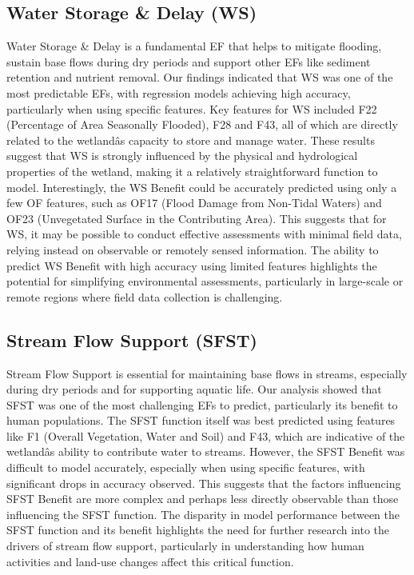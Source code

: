 \documentclass[12pt,letterpaper]{article}
\begin{document}
\subsection{Water Storage \& Delay (\ac{WS})}
Water Storage \& Delay is a fundamental \ac{EF} that helps to mitigate flooding, sustain base flows during dry periods and support other \acp{EF} like sediment retention and nutrient removal.
Our findings indicated that \ac{WS} was one of the most predictable \acp{EF}, with regression models achieving high accuracy, particularly when using specific features.
Key features for \ac{WS} included F22 (Percentage of Area Seasonally Flooded), F28 and F43, all of which are directly related to the wetlandâs capacity to store and manage water.
These results suggest that \ac{WS} is strongly influenced by the physical and hydrological properties of the wetland, making it a relatively straightforward function to model.
Interestingly, the \ac{WS} Benefit could be accurately predicted using only a few \ac{OF} features, such as OF17 (Flood Damage from Non-Tidal Waters) and OF23 (Unvegetated Surface in the Contributing Area).
This suggests that for \ac{WS}, it may be possible to conduct effective assessments with minimal field data, relying instead on observable or remotely sensed information.
The ability to predict \ac{WS} Benefit with high accuracy using limited features highlights the potential for simplifying environmental assessments, particularly in large-scale or remote regions where field data collection is challenging.

\subsection{Stream Flow Support (\ac{SFST})}
Stream Flow Support is essential for maintaining base flows in streams, especially during dry periods and for supporting aquatic life.
Our analysis showed that \ac{SFST} was one of the most challenging \acp{EF} to predict, particularly its benefit to human populations.
The \ac{SFST} function itself was best predicted using features like F1 (Overall Vegetation, Water and Soil) and F43, which are indicative of the wetlandâs ability to contribute water to streams.
However, the \ac{SFST} Benefit was difficult to model accurately, especially when using specific features, with significant drops in accuracy observed.
This suggests that the factors influencing \ac{SFST} Benefit are more complex and perhaps less directly observable than those influencing the \ac{SFST} function.
The disparity in model performance between the \ac{SFST} function and its benefit highlights the need for further research into the drivers of stream flow support, particularly in understanding how human activities and land-use changes affect this critical function.
\end{document}
